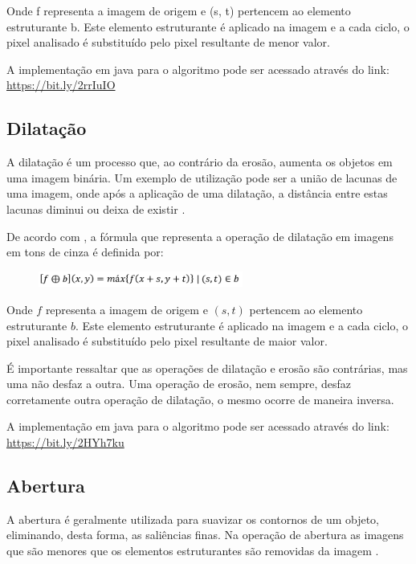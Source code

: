 \documentclass[
	12pt,				%
	oneside,			%
	a4paper,			%
	english,			%
	french,				%
	spanish,			%
	brazil,				%
	]{abntex2}
\begin{document}
Onde f representa a imagem de origem e (s, t) pertencem ao elemento estruturante b. Este elemento estruturante é aplicado na imagem e a cada ciclo, o pixel analisado é substituído pelo pixel resultante de menor valor.

A implementação em java para o algoritmo pode ser acessado através do link: \url{https://bit.ly/2rrIuIO}

\subsection{Dilatação}

A dilatação é um processo que, ao contrário da erosão, aumenta os objetos em uma imagem binária. Um exemplo de utilização pode ser a união de lacunas de uma imagem, onde após a aplicação de uma dilatação, a distância entre estas lacunas diminui ou deixa de existir \cite{gonzalesWoods:2008}. 

De acordo com \citet{pedriniSchwartz:2008}, a fórmula que representa a operação de dilatação em imagens em tons de cinza é definida por:

\begin{figure}[ht]
\centering
\includegraphics[width=0.6\textwidth]{imagens/dilatacao_formula.png}
\end{figure}

Onde \(f\) representa a imagem de origem e \((s, t)\) pertencem ao elemento estruturante \(b\). Este elemento estruturante é aplicado na imagem e a cada ciclo, o pixel analisado é substituído pelo pixel resultante de maior valor.

É importante ressaltar que as operações de dilatação e erosão são contrárias, mas uma não desfaz a outra. Uma operação de erosão, nem sempre, desfaz corretamente outra operação de dilatação, o mesmo ocorre de maneira inversa.

A implementação em java para o algoritmo pode ser acessado através do link: \url{https://bit.ly/2HYh7ku}

\subsection{Abertura}

A abertura é geralmente utilizada para suavizar os contornos de um objeto, eliminando, desta forma, as saliências finas. Na operação de abertura as imagens que são menores que os elementos estruturantes são removidas da imagem \cite{gonzalesWoods:2008}.
\end{document}
